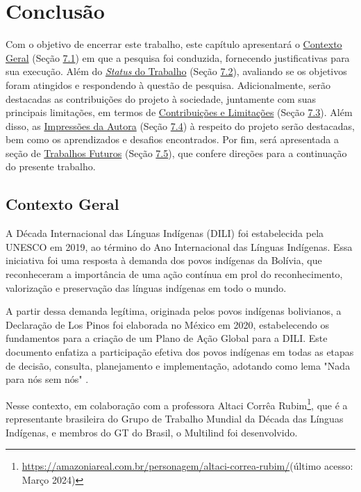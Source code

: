 \chapter[Conclusão]{Conclusão}
\label{chap:Conclusão}
Com o objetivo de encerrar este trabalho, este capítulo apresentará o \hyperref[sec:Contexto Geral]{Contexto Geral} (Seção \hyperref[sec:Contexto Geral]{7.1}) 
em que a pesquisa foi conduzida, fornecendo justificativas para sua execução. Além do \hyperref[sec:Status do Trabalho]{\textit{Status} 
do Trabalho} (Seção \hyperref[sec:Status do Trabalho]{7.2}), avaliando se os objetivos foram atingidos e respondendo à questão de pesquisa. Adicionalmente, 
serão destacadas as contribuições do projeto à sociedade, juntamente com suas principais limitações, em termos de 
\hyperref[sec:Contribuições e Limitações]{Contribuições e Limitações} (Seção \hyperref[sec:Contexto Geral]{7.3}). Além disso, as \hyperref[sec:Impressões da Autora]{Impressões da Autora} 
(Seção \hyperref[sec:Impressões da Autora]{7.4}) à respeito do projeto serão destacadas, bem como os aprendizados e desafios encontrados. Por fim, será apresentada a seção de 
\hyperref[sec:Trabalhos Futuros]{Trabalhos Futuros} (Seção \hyperref[sec:Trabalhos Futuros]{7.5}), 
que confere direções para a continuação do presente trabalho.

\section{Contexto Geral}
\label{sec:Contexto Geral}
A Década Internacional das Línguas Indígenas (DILI) foi estabelecida pela UNESCO em 2019, ao término do Ano Internacional das Línguas 
Indígenas. Essa iniciativa foi uma resposta à demanda dos povos indígenas da Bolívia, que reconheceram a importância de uma ação contínua em prol do reconhecimento, 
valorização e preservação das línguas indígenas em todo o mundo. 

A partir dessa demanda legítima, originada pelos povos indígenas bolivianos, a Declaração de Los Pinos foi elaborada no México em 2020, estabelecendo os fundamentos 
para a criação de um Plano de Ação Global para a DILI. Este documento enfatiza a participação efetiva dos povos indígenas em todas as etapas de decisão, consulta, 
planejamento e implementação, adotando como lema "Nada para nós sem nós" \cite{gtbrasil2024}.

Nesse contexto, em colaboração com a professora Altaci Corrêa Rubim\footnote{\url{https://amazoniareal.com.br/personagem/altaci-correa-rubim/}(último acesso: Março 2024)}, 
que é a representante brasileira do Grupo de Trabalho Mundial da Década das Línguas Indígenas, e membros do GT do Brasil, o Multilind foi desenvolvido. 

